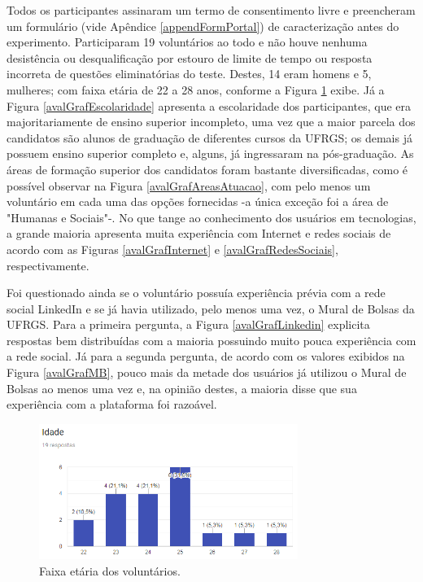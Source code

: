Todos os participantes assinaram um termo de consentimento livre e preencheram um formulário (vide Apêndice \ref{appendFormPortal}) de caracterização antes do experimento. Participaram 19 voluntários ao todo e não houve nenhuma desistência ou desqualificação por estouro de limite de tempo ou resposta incorreta de questões eliminatórias do teste. Destes, 14 eram homens e 5, mulheres; com faixa etária de 22 a 28 anos, conforme a Figura \ref{avalGrafIdade} exibe. Já a Figura \ref{avalGrafEscolaridade} apresenta a escolaridade dos participantes, que era majoritariamente de ensino superior incompleto, uma vez que a maior parcela dos candidatos são alunos de graduação de diferentes cursos da UFRGS; os demais já possuem ensino superior completo e, alguns, já ingressaram na pós-graduação. As áreas de formação superior dos candidatos foram bastante diversificadas, como é possível observar na Figura \ref{avalGrafAreasAtuacao}, com pelo menos um voluntário em cada uma das opções fornecidas -a única exceção foi a área de "Humanas e Sociais"-. No que tange ao conhecimento dos usuários em tecnologias, a grande maioria apresenta muita experiência com Internet e redes sociais de acordo com as Figuras \ref{avalGrafInternet} e \ref{avalGrafRedesSociais}, respectivamente. 

Foi questionado ainda se o voluntário possuía experiência prévia com a rede social LinkedIn e se já havia utilizado, pelo menos uma vez, o Mural de Bolsas da UFRGS. Para a primeira pergunta, a Figura \ref{avalGrafLinkedin} explicita respostas bem distribuídas com a maioria possuindo muito pouca experiência com a rede social. Já para a segunda pergunta, de acordo com os valores exibidos na Figura \ref{avalGrafMB}, pouco mais da metade dos usuários já utilizou o Mural de Bolsas ao menos uma vez e, na opinião destes, a maioria disse que sua experiência com a plataforma foi razoável.

\begin{figure}[h]
    \caption{Faixa etária dos voluntários.}
       	\begin{center}
            \includegraphics[width=0.75\textwidth]{figuras/avaliacao/idade.png}
        \end{center}
    \label{avalGrafIdade}
\end{figure}    

